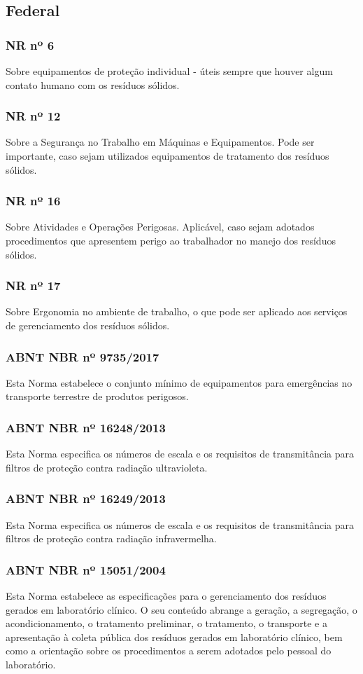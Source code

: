 \begin{subapend}
	\subsection{Federal}
	\begin{subsubapend}
		\item \subsubsection{NR nº 6}
		Sobre equipamentos de proteção individual - úteis sempre que houver algum contato humano com os resíduos sólidos.
		\subsubsection{NR nº 12}
		Sobre a Segurança no Trabalho em Máquinas e Equipamentos. Pode ser importante, caso sejam utilizados equipamentos de tratamento dos resíduos sólidos.
		\subsubsection{NR nº 16}
		Sobre Atividades e Operações Perigosas. Aplicável, caso sejam adotados procedimentos que apresentem perigo ao trabalhador no manejo dos resíduos sólidos.
		\subsubsection{NR nº 17}
		Sobre Ergonomia no ambiente de trabalho, o que pode ser aplicado aos serviços de gerenciamento dos resíduos sólidos.
		\subsubsection{ ABNT NBR nº 9735/2017}
		Esta Norma estabelece o conjunto mínimo de equipamentos para emergências no transporte terrestre de produtos perigosos.
		\subsubsection{	ABNT NBR nº 16248/2013}
		Esta Norma especifica os números de escala e os requisitos de transmitância para filtros de proteção contra radiação ultravioleta.
		\subsubsection{ ABNT NBR nº 16249/2013}
		Esta Norma especifica os números de escala e os requisitos de transmitância para filtros de proteção contra radiação infravermelha.
		\subsubsection{ABNT NBR nº 15051/2004}
		Esta Norma estabelece as especificações para o gerenciamento dos resíduos gerados em laboratório clínico. O seu conteúdo abrange a geração, a segregação, o acondicionamento, o tratamento preliminar, o tratamento, o transporte e a apresentação à coleta pública dos resíduos gerados em laboratório clínico, bem como a orientação sobre os procedimentos a serem adotados pelo pessoal do laboratório.
	\end{subsubapend}
\end{subapend}

